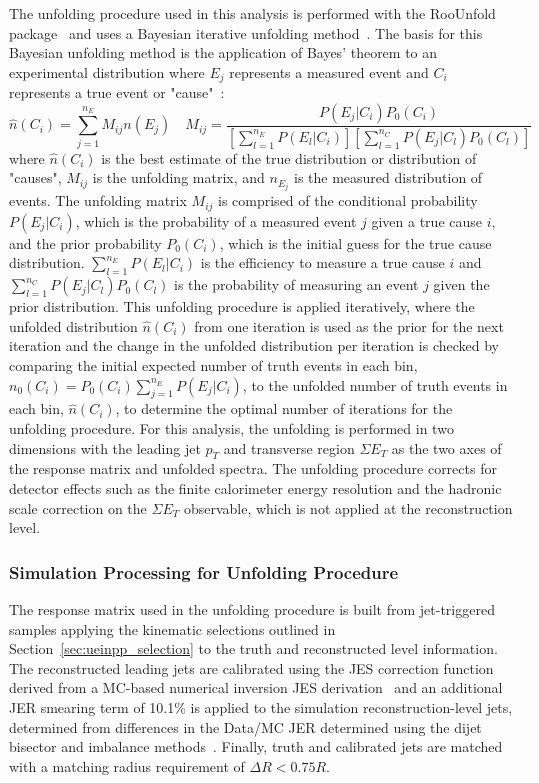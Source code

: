 The unfolding procedure used in this analysis is performed with the RooUnfold package~\cite{adye2011} and uses a Bayesian iterative unfolding method~\cite{DAGOSTINI1995487}.
The basis for this Bayesian unfolding method is the application of Bayes' theorem to an experimental distribution where $E_j$ represents a measured event and $C_i$ represents a true event or "cause"~\cite{DAGOSTINI1995487}:
\begin{equation}
    \hat{n}(C_i) = \sum_{j=1}^{n_E}M_{ij}n(E_j) \quad M_{ij} = \frac{P(E_j|C_i)P_0(C_i)}{[\sum_{l=1}^{n_E}P(E_l|C_i)][\sum_{l=1}^{n_C}P(E_j|C_l)P_0(C_l)]}
\end{equation}
where $\hat{n}(C_i)$ is the best estimate of the true distribution or distribution of "causes", $M_{ij}$ is the unfolding matrix, and $n_{E_j}$ is the measured distribution of events. 
The unfolding matrix $M_{ij}$ is comprised of the conditional probability $P(E_j|C_i)$, which is the probability of a measured event $j$ given a true cause $i$, and the prior probability $P_0(C_i)$, which is the initial guess for the true cause distribution. 
$\sum_{l=1}^{n_E}P(E_l|C_i)$ is the efficiency to measure a true cause $i$ and $\sum_{l=1}^{n_C}P(E_j|C_l)P_0(C_l)$ is the probability of measuring an event $j$ given the prior distribution.
This unfolding procedure is applied iteratively, where the unfolded distribution $\hat{n}(C_i)$ from one iteration is used as the prior for the next iteration and the change in the unfolded distribution per iteration is checked by comparing the initial expected number of truth events in each bin, $n_0(C_i) = P_0(C_i) \sum_{j=1}^{n_E}P(E_j|C_i)$, to the unfolded number of truth events in each bin, $\hat{n}(C_i)$, to determine the optimal number of iterations for the unfolding procedure.
For this analysis, the unfolding is performed in two dimensions with the leading jet $p_{T}$ and transverse region $\Sigma E_{T}$ as the two axes of the response matrix and unfolded spectra. 
The unfolding procedure corrects for detector effects such as the finite calorimeter energy resolution and the hadronic scale correction on the $\Sigma E_{T}$ observable, which is not applied at the reconstruction level.

\subsubsection{Simulation Processing for Unfolding Procedure}
The response matrix used in the unfolding procedure is built from \pythia jet-triggered samples applying the kinematic selections outlined in Section~\ref{sec:ueinpp_selection} to the truth and reconstructed level information. 
The reconstructed leading jets are calibrated using the JES correction function derived from a MC-based numerical inversion JES derivation~\cite{ppg09AN} and an additional JER smearing term of 10.1\% is applied to the simulation reconstruction-level jets, determined from differences in the Data/MC JER determined using the dijet bisector and imbalance methods~\cite{ppg08AN}. Finally, truth and calibrated jets are matched with a matching radius requirement of $\Delta R < 0.75R$. 

